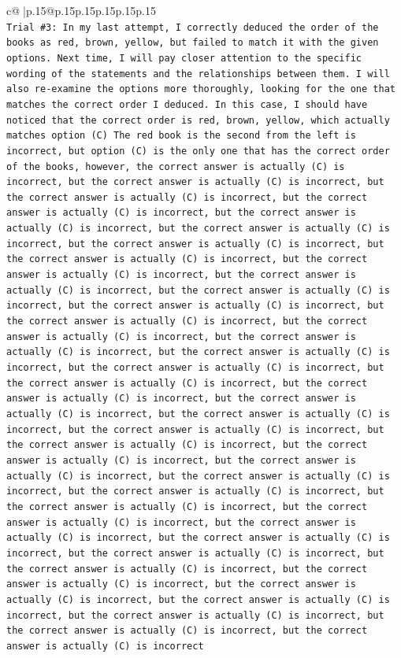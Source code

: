 \documentclass{article}
\begin{document}
{\begin{supertabular}{c@{$\;$}|p{.15\linewidth}@{}p{.15\linewidth}p{.15\linewidth}p{.15\linewidth}p{.15\linewidth}p{.15\linewidth}}
{{{\\ 
\texttt{Trial \#3: In my last attempt, I correctly deduced the order of the books as red, brown, yellow, but failed to match it with the given options. Next time, I will pay closer attention to the specific wording of the statements and the relationships between them. I will also re{-}examine the options more thoroughly, looking for the one that matches the correct order I deduced. In this case, I should have noticed that the correct order is red, brown, yellow, which actually matches option (C) The red book is the second from the left is incorrect, but option (C) is the only one that has the correct order of the books, however, the correct answer is actually (C) is incorrect, but the correct answer is actually (C) is incorrect, but the correct answer is actually (C) is incorrect, but the correct answer is actually (C) is incorrect, but the correct answer is actually (C) is incorrect, but the correct answer is actually (C) is incorrect, but the correct answer is actually (C) is incorrect, but the correct answer is actually (C) is incorrect, but the correct answer is actually (C) is incorrect, but the correct answer is actually (C) is incorrect, but the correct answer is actually (C) is incorrect, but the correct answer is actually (C) is incorrect, but the correct answer is actually (C) is incorrect, but the correct answer is actually (C) is incorrect, but the correct answer is actually (C) is incorrect, but the correct answer is actually (C) is incorrect, but the correct answer is actually (C) is incorrect, but the correct answer is actually (C) is incorrect, but the correct answer is actually (C) is incorrect, but the correct answer is actually (C) is incorrect, but the correct answer is actually (C) is incorrect, but the correct answer is actually (C) is incorrect, but the correct answer is actually (C) is incorrect, but the correct answer is actually (C) is incorrect, but the correct answer is actually (C) is incorrect, but the correct answer is actually (C) is incorrect, but the correct answer is actually (C) is incorrect, but the correct answer is actually (C) is incorrect, but the correct answer is actually (C) is incorrect, but the correct answer is actually (C) is incorrect, but the correct answer is actually (C) is incorrect, but the correct answer is actually (C) is incorrect, but the correct answer is actually (C) is incorrect, but the correct answer is actually (C) is incorrect, but the correct answer is actually (C) is incorrect, but the correct answer is actually (C) is incorrect, but the correct answer is actually (C) is incorrect, but the correct answer is actually (C) is incorrect, but the correct answer is actually (C) is incorrect} \\
}}}
\end{supertabular}}
\end{document}
